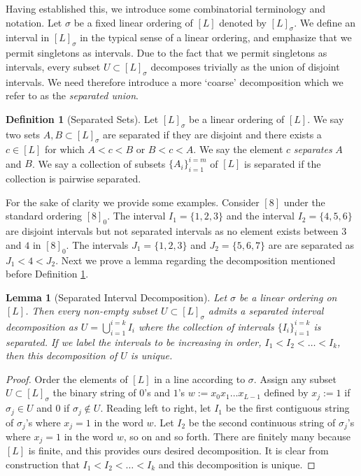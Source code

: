 \documentclass[11pt,a4paper]{amsart}
\newtheorem{lemma}[theorem]{Lemma}
\theoremstyle{definition}
\newtheorem{definition}[theorem]{Definition}
\theoremstyle{remark}
\begin{document}
Having established this, we introduce some combinatorial terminology and notation.  Let $\sigma$ be a fixed linear ordering of $[L]$ denoted by $[L]_{\sigma}$.  We define an interval in $[L]_{\sigma}$ in the typical sense of a linear ordering, and emphasize that we permit singletons as intervals.  Due to the fact that we permit singletons as intervals, every subset $U \subset [L]_{\sigma}$ decomposes trivially as the union of disjoint intervals.  We need therefore introduce a more `coarse' decomposition which we refer to as the \emph{separated union}.  
\begin{definition}[Separated Sets]\label{def:separated_int}
Let $[L]_{\sigma}$ be a linear ordering of $[L]$.  We say two sets $A,B \subset [L]_{\sigma}$ are separated if they are disjoint and there exists a $c \in [L]$ for which $A < c < B$ or $B < c < A$.  We say the element $c$ \emph{separates} $A$ and $B$.  We say a collection of subsets $\{A_{i}\}_{i=1}^{i=m}$ of $[L]$ is separated if the collection is pairwise separated.
\end{definition}

For the sake of clarity we provide some examples.  Consider $[8]$ under the standard ordering $[8]_{0}$.  The interval $I_{1} = \{1,2,3\}$ and the interval $I_{2} = \{4,5,6\}$ are disjoint intervals but not separated intervals as no element exists between $3$ and $4$ in $[8]_{0}$.  The intervals $J_{1} = \{1,2,3\}$ and $J_{2} = \{5,6,7\}$ are are separated as $J_{1} < 4 < J_{2}$.  Next we prove a lemma regarding the decomposition mentioned before Definition \ref{def:separated_int}.  

\begin{lemma}[Separated Interval Decomposition]\label{lem:sep_int_decom}
Let $\sigma$ be a linear ordering on $[L]$.  Then every non-empty subset $U \subset [L]_{\sigma}$ admits a separated interval decomposition as $U = \bigcup_{i=1}^{i=k} I_{i}$ where the collection of intervals $\{I_{i}\}_{i=1}^{i=k}$ is separated.  If we label the intervals to be increasing in order, $I_{1} < I_{2} < \hdots < I_{k}$, then this decomposition of $U$ is unique.
\end{lemma}

\begin{proof}
Order the elements of $[L]$ in a line according to $\sigma$.  Assign any subset $U \subset [L]_{\sigma}$ the binary string of $0$'s and $1$'s $w := x_{0}x_{1}\hdots x_{L-1}$ defined by $x_{j} := 1$ if $\sigma_{j} \in U$ and $0$ if $\sigma_{j} \notin U$.  Reading left to right, let $I_{1}$ be the first contiguous string of $\sigma_{j}$'s where $x_{j} = 1$ in the word $w$.  Let $I_{2}$ be the second continuous string of $\sigma_{j}$'s where $x_{j} = 1$ in the word $w$, so on and so forth.  There are finitely many because $[L]$ is finite, and this provides ours desired decomposition.  It is clear from construction that $I_{1} < I_{2} < \hdots < I_{k}$ and this decomposition is unique.  
\end{proof}
\end{document}
